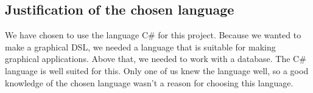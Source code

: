 
\subsection{Justification of the chosen language}
We have chosen to use the language C\# for this project. Because we wanted to make a graphical DSL, we needed a language that is suitable for making graphical applications. Above that, we needed to work with a database. The C\# language is well suited for this. Only one of us knew the language well, so a good knowledge of the chosen language wasn't a reason for choosing this language.